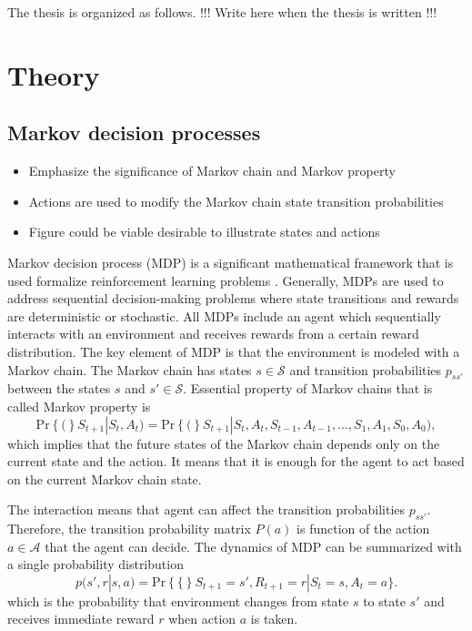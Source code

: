 \documentclass[11pt,a4paper]{article}
\newcommand{\Ss}{\mathcal{S}}
\newcommand{\As}{\mathcal{A}}
\renewcommand{\Pr}[1]{\text{Pr}\left\{ #1 \right\}}
\begin{document}
The thesis is organized as follows. !!! Write here when the thesis is written !!!

\newpage
\section{Theory}
\subsection{Markov decision processes} \label{sec:MDP}

\begin{itemize}
    \item Emphasize the significance of Markov chain and Markov property
    \item Actions are used to modify the Markov chain state transition probabilities
    \item Figure could be viable desirable to illustrate states and actions
\end{itemize}

Markov decision process (MDP) is a significant mathematical framework that is used formalize reinforcement learning problems \cite{Sutton2018}.
Generally, MDPs are used to address sequential decision-making problems where state transitions and rewards are deterministic or stochastic.
All MDPs include an agent which sequentially interacts with an environment and receives rewards from a certain reward distribution.
The key element of MDP is that the environment is modeled with a Markov chain.
The Markov chain has states $s \in \Ss$ and transition probabilities $p_{ss'}$ between the states $s$ and $s' \in \Ss$.
Essential property of Markov chains that is called Markov property is  
\begin{equation} \label{eq:markov_property}
    \Pr(S_{t+1} | S_t, A_t) = \Pr(S_{t+1} | S_t, A_t, S_{t-1}, A_{t-1}, ..., S_1, A_1, S_0, A_0),
\end{equation}
which implies that the future states of the Markov chain depends only on the current state and the action.
It means that it is enough for the agent to act based on the current Markov chain state.

The interaction means that agent can affect the transition probabilities $p_{ss'}$.
Therefore, the transition probability matrix $P(a)$ is function of the action $a\in \As$ that the agent can decide.
The dynamics of MDP can be summarized with a single probability distribution
\begin{equation}\label{eq:MDP_probs}
    p(s', r | s, a) = \Pr \{ S_{t+1}=s', R_{t+1}=r | S_t=s, A_t=a \}.
\end{equation}
which is the probability that environment changes from state $s$ to state $s'$ and receives immediate reward $r$ when action $a$ is taken.
\end{document}

